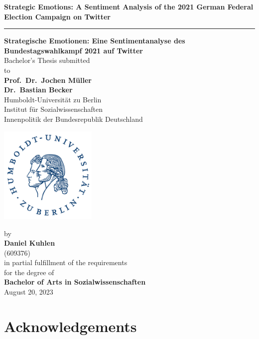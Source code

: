 \documentclass[a4paper,11pt]{article}
\begin{document}
\thispagestyle{empty}
\begin{center}
  {\Large{\bf Strategic Emotions: A Sentiment Analysis of the 2021 German Federal Election Campaign on Twitter}} \vspace{0.4cm}
  \hrule \vspace{0.2cm}
  {\Large{\bf Strategische Emotionen: Eine Sentimentanalyse des Bundestagswahlkampf 2021 auf Twitter}} \\\vspace{0.5cm}  %
  Bachelor's Thesis submitted \\\vspace{0.5cm}
  to \\\vspace{0.5cm}
  \textbf{Prof.~Dr.~Jochen Müller} \\
  \textbf{Dr.~Bastian Becker} \\\vspace{0.5cm}
  Humboldt-Universität zu Berlin \\
  Institut für Sozialwissenschaften \\
  Innenpolitik der Bundesrepublik Deutschland \\
   \vspace{1cm}

  \includegraphics[width=0.35\textwidth]{figures/hu_logo_small.png}
  
  by \\\vspace{0.5cm}
  \textbf{Daniel Kuhlen} \\
  (609376) \\
  
  \medskip
  \medskip
  in partial fulfillment of the requirements \\
  for the degree of \\
  \textbf{Bachelor of Arts in Sozialwissenschaften} \\\vspace{0.5cm}
  August 20, 2023
  
\end{center}
\newpage
\hypertarget{acknowledgements}{%
\section*{Acknowledgements}\label{acknowledgements}}
\end{document}
